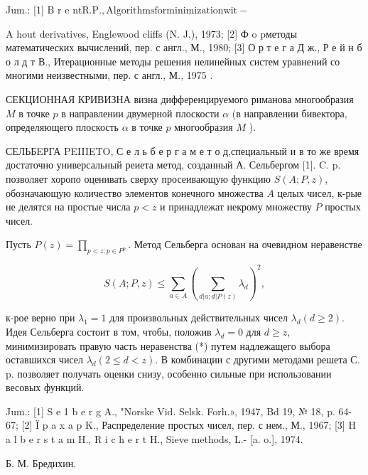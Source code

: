 \documentclass[10pt]{article}
\begin{document}
Jum.: [1] B r e $\mathrm{n} \mathrm{t} \mathrm{R.P.,} \mathrm{Algorithms} \mathrm{for} \mathrm{minimization} \mathrm{wit-}$

A hout derivatives, Englewood cliffs (N. J.), 1973; [2] Ф o pметоды математических вычислений, пер. с англ., М., 1980; [3] О р т е г а Д ж., Р е й н б о л д т В., Итерационные методы решения нелинейных систем уравнений со многими неизвестными, пер. с англ., М., 1975 .



СЕКЦИОННАЯ КРИВИЗНА визна дифференцируемого риманова многообразия $M$ в точке $p$ в направлении двумерной плоскости $\alpha$ (в направлении бивектора, определяющего плоскость $\alpha$ в точке $p$ многообразия $M$ ).



СЕЛЬБEРГА PEIIIETO, С е л ь б е р г а м е т $о$ д,специальный и в то же время достаточно универсальный реиета метод, созданный А. Сельбергом [1]. C. p. позволяет хоропо оценивать сверху просеивающую функцию $S(A ; P, z)$, обозначающую количество элементов конечного множества $A$ целых чисел, к-рые не делятся на простые числа $p<z$ и принадлежат некрому множеству $P$ простых чисел.



Пусть $P(z)=\prod_{p<z ; p \in P^{p}}$. Метод Сельберга основан на очевидном неравенстве



\[

S(A ; P, z) \leqslant \sum_{a \in A}\left(\sum_{d|a ; d| P(z)} \lambda_{d}\right)^{2},

\]



к-рое верно при $\lambda_{1}=1$ для произвольных действительных чисел $\lambda_{d}(d \geqslant 2)$. Идея Сельберга состоит в том, чтобы, положив $\lambda_{d}=0$ для $d \geqslant z$, минимизировать правую часть неравенства (*) путем надлежащего выбора оставшихся чисел $\lambda_{d}(2 \leqslant d<z)$. В комбинации с другими методами решета С. p. позволяет получать оценки снизу, особенно сильные при использовании весовых функций.



Jum.: [1] S e 1 b e r g A., "Norske Vid. Selsk. Forh.», 1947, Bd 19, № 18, p. 64-67; [2] Ï p a x a p K., Распределение простых чисел, пер. с нем., М., 1967; [3] H a l b e r s t a m H., R i c h e r t H., Sieve methods, L.- [a. o.], 1974.



Б. М. Бредихин.
\end{document}
